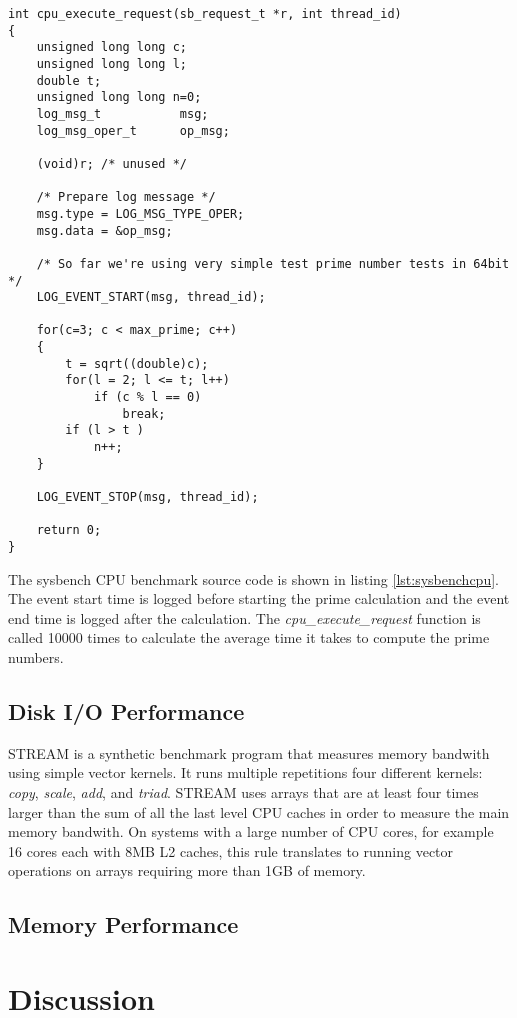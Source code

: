 \documentclass[11pt]{article}
\begin{document}
\lstset{caption=Sysbench CPU Benchmark Source Code, label=lst:sysbenchcpu}
\begin{lstlisting}
int cpu_execute_request(sb_request_t *r, int thread_id)
{
	unsigned long long c;
	unsigned long long l;
	double t;
	unsigned long long n=0;
	log_msg_t           msg;
	log_msg_oper_t      op_msg;
	
	(void)r; /* unused */
	
	/* Prepare log message */
	msg.type = LOG_MSG_TYPE_OPER;
	msg.data = &op_msg;
	
	/* So far we're using very simple test prime number tests in 64bit */
	LOG_EVENT_START(msg, thread_id);
	
	for(c=3; c < max_prime; c++)  
	{
		t = sqrt((double)c);
		for(l = 2; l <= t; l++)
			if (c % l == 0)
				break;
		if (l > t )
			n++; 
	}
	
	LOG_EVENT_STOP(msg, thread_id);
	
	return 0;
}
\end{lstlisting}

The sysbench CPU benchmark source code is shown in listing \ref{lst:sysbenchcpu}. The event start time is logged before starting the prime calculation and the event end time is logged after the calculation. The \textit{cpu\_execute\_request} function is called 10000 times to calculate the average time it takes to compute the prime numbers. 

\subsection{Disk I/O Performance}
STREAM is a synthetic benchmark program that measures memory bandwith using simple vector kernels. It runs multiple repetitions four different kernels: \textit{copy}, \textit{scale}, \textit{add}, and \textit{triad}. STREAM uses arrays that are at least four times larger than the sum of all the last level CPU caches in order to measure the main memory bandwith. On systems with a large number of CPU cores, for example 16 cores each with 8MB L2 caches, this rule translates to running vector operations on arrays requiring more than 1GB of memory. 

\subsection{Memory Performance}

\section{Discussion}
\end{document}
